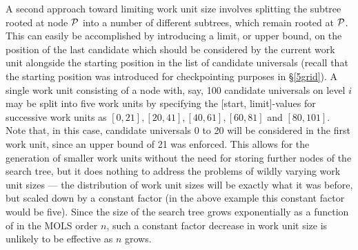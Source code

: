 A second approach toward limiting work unit size involves splitting the subtree rooted at node $\mathcal{P}$ into a number of different subtrees, which remain rooted at $\mathcal{P}$. 
This can easily be accomplished by introducing a limit, or upper bound, on the position of the last candidate which should be considered by the current  work unit alongside the starting position in the list of candidate universals (recall that the starting position was introduced for checkpointing purposes in \S\ref{5grid}).
 A single work unit consisting of a node with, say, 100 candidate universals on level $i$ may be split into five work units by specifying the [start, limit]-values for successive work units as $[0,21], [20,41], [40, 61], [60, 81]$ and $[80,101]$. Note that, in this case, candidate universals 0 to 20 will be considered in the first work unit, since an upper bound of 21 was enforced. 
This allows for the generation of smaller work units without the need for storing further nodes of  the search tree, but it does nothing to address the problems of wildly varying work unit sizes --- the distribution of work unit sizes will be exactly what it was before, but scaled down by a constant factor (in the above example this constant factor would be five). Since the size of the search tree grows exponentially as a function of  in the MOLS order $n$, such a constant factor decrease in work unit size is unlikely to be effective as $n$ grows.

